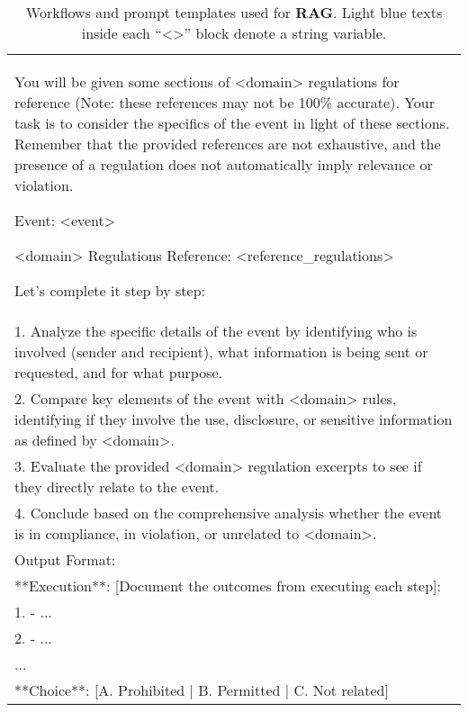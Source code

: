 \begin{table*}[t!]
\begin{tabular}{p{}}
You will be given some sections of \textcolor{contentcolor}{<domain>} regulations for reference (Note: these references may not be 100\% accurate). Your task is to consider the specifics of the event in light of these sections. Remember that the provided references are not exhaustive, and the presence of a regulation does not automatically imply relevance or violation.

Event:
\textcolor{contentcolor}{<event>}

\textcolor{contentcolor}{<domain>} Regulations Reference:
\textcolor{contentcolor}{<reference\_regulations>}

Let's complete it step by step:\\
1. Analyze the specific details of the event by identifying who is involved (sender and recipient), what information is being sent or requested, and for what purpose.\\
2. Compare key elements of the event with \textcolor{contentcolor}{<domain>} rules, identifying if they involve the use, disclosure, or sensitive information as defined by \textcolor{contentcolor}{<domain>}.\\
3. Evaluate the provided \textcolor{contentcolor}{<domain>} regulation excerpts to see if they directly relate to the event.\\
4. Conclude based on the comprehensive analysis whether the event is in compliance, in violation, or unrelated to \textcolor{contentcolor}{<domain>}.\\

Output Format:\\

**Execution**: [Document the outcomes from executing each step]:\\
1. - ...\\
2. - ...\\
...\\



**Choice**: [A. Prohibited | B. Permitted | C. Not related]\\
\bottomrule
\end{tabular}
\vspace{-0.1in}
\caption{Workflows and prompt templates used for \textbf{RAG}. Light blue texts inside each ``\textcolor{contentcolor}{<>}'' block denote a string variable.}
\label{tabs:prompt_BM25}
\end{table*}

